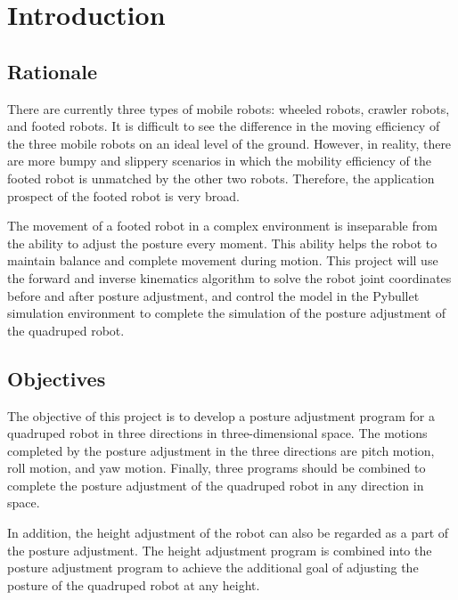 \chapter{Introduction}

\section{Rationale}

There are currently three types of mobile robots: wheeled robots, crawler robots, and footed robots. It is difficult to see the difference in the moving efficiency of the three mobile robots on an ideal level of the ground. However, in reality, there are more bumpy and slippery scenarios in which the mobility efficiency of the footed robot is unmatched by the other two robots. Therefore, the application prospect of the footed robot is very broad.

The movement of a footed robot in a complex environment is inseparable from the ability to adjust the posture every moment. This ability helps the robot to maintain balance and complete movement during motion. This project will use the forward and inverse kinematics algorithm to solve the robot joint coordinates before and after posture adjustment, and control the model in the Pybullet simulation environment to complete the simulation of the posture adjustment of the quadruped robot.

\section{Objectives}

The objective of this project is to develop a posture adjustment program for a quadruped robot in three directions in three-dimensional space. The motions completed by the posture adjustment in the three directions are pitch motion, roll motion, and yaw motion. Finally, three programs should be combined to complete the posture adjustment of the quadruped robot in any direction in space.

In addition, the height adjustment of the robot can also be regarded as a part of the posture adjustment. The height adjustment program is combined into the posture adjustment program to achieve the additional goal of adjusting the posture of the quadruped robot at any height.
